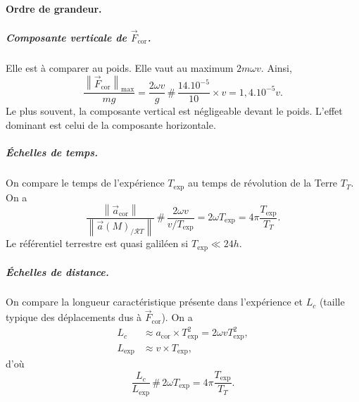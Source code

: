             \paragraph{Ordre de grandeur.}

                \subparagraph{Composante verticale de $\vec{F}_{\text{cor}}$.}

                    Elle est à comparer au poids. Elle vaut au maximum $2m\omega v$. Ainsi,
                    \begin{equation}
                        \frac{\left\lVert\vec{F}_{\text{cor}}\right\rVert_{\text{max}}}{mg}=\frac{2\omega v}{g}\,\#\,\frac{14.10^{-5}}{10}\times v = 1,4.10^{-5}v.
                    \end{equation}
                    Le plus souvent, la composante vertical est négligeable devant le poids. L'effet dominant est celui de la composante horizontale.

                \subparagraph{Échelles de temps.}

                    On compare le temps de l'expérience $T_{\text{exp}}$ au temps de révolution de la Terre $T_T$. On a 
                    \begin{equation}
                        \frac{\left\lVert\vec{a}_{\text{cor}}\right\rVert}{\left\lVert\vec{a}(M)_{/\mathcal{R}T}\right\rVert}\,\#\,\frac{2\omega v}{v/T_{\text{exp}}}=2\omega T_{\text{exp}}=4\pi\frac{T_{\text{exp}}}{T_T}.
                    \end{equation}
                    Le référentiel terrestre est quasi galiléen si $T_{\text{exp}}\ll 24h$.

                \subparagraph{Échelles de distance.}

                    On compare la longueur caractéristique présente dans l'expérience et $L_c$ (taille typique des déplacements dus à $\vec{F}_{\text{cor}}$). On a 
                    \begin{equation}
                        \begin{aligned}
                            L_c & \approx a_{\text{cor}}\times T_{\text{exp}}^{2}=2\omega vT_{\text{exp}}^{2},\\
                            L_{\text{exp}} & \approx v\times T_{\text{exp}},
                        \end{aligned}
                    \end{equation}
                    d'où 
                    \begin{equation}
                        \frac{L_c}{L_{\text{exp}}}\,\#\,2\omega T_{\text{exp}}=4\pi\frac{T_{\text{exp}}}{T_T}.
                    \end{equation}

